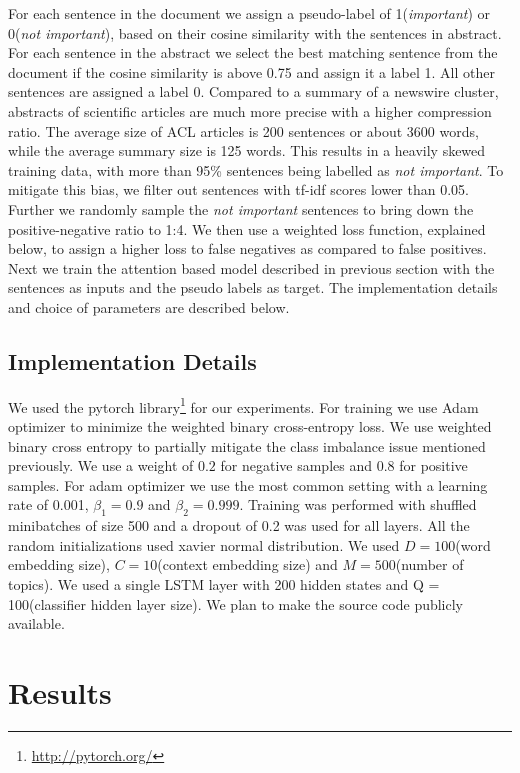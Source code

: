 For each sentence in the document we assign a pseudo-label of 1(\emph{important}) or 0(\emph{not important}), based on their cosine similarity with the sentences in abstract. For each sentence in the abstract we select the best matching sentence from the document if the cosine similarity is above 0.75 and assign it a label 1. All other sentences are assigned a label 0. Compared to a summary of a newswire cluster, abstracts of scientific articles are much more precise with a higher compression ratio. The average size of ACL articles is 200 sentences or about 3600 words, while the average summary size is 125 words. This results in a heavily skewed training data, with more than 95\% sentences being labelled as \emph{not important}. To mitigate this bias, we filter out sentences with tf-idf scores lower than 0.05. Further we randomly sample the \emph{not important} sentences to bring down the positive-negative ratio to 1:4. We then use a weighted loss function, explained below, to assign a higher loss to false negatives as compared to false positives. Next we train the attention based model described in previous section with the sentences as inputs and the pseudo labels as target. The implementation details and choice of parameters are described below.

\subsection{Implementation Details} 

We used the pytorch library\footnote{\url{http://pytorch.org/}} for our experiments. For training we use Adam optimizer to minimize the weighted binary cross-entropy loss. We use weighted binary cross entropy to partially mitigate the class imbalance issue mentioned previously. We use a weight of $0.2$ for negative samples and $0.8$ for positive samples. For adam optimizer we use the most common setting with a learning rate of 0.001, $\beta_1 = 0.9$ and $\beta_2=0.999$. Training was performed with shuffled minibatches of size 500 and a dropout of 0.2 was used for all layers. All the random initializations used xavier normal distribution. We used $D = 100$(word embedding size), $C = 10$(context embedding size) and $M = 500$(number of topics). We used a single LSTM layer with 200 hidden states and Q = 100(classifier hidden layer size). We plan to make the source code publicly available.
 
\section{Results}

